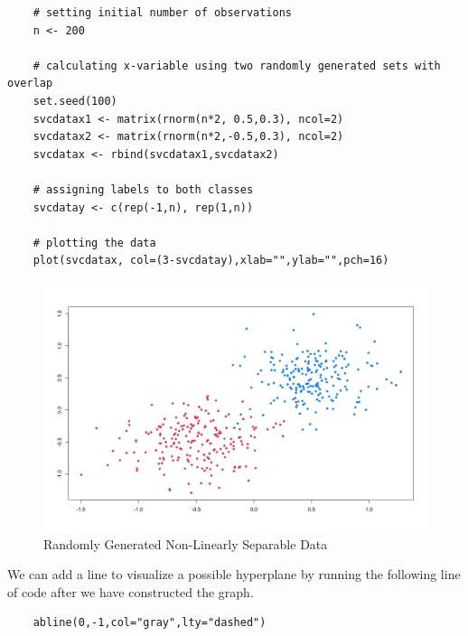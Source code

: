 \documentclass[12pt]{article}
\begin{document}
\begin{verbatim}
    # setting initial number of observations
    n <- 200
    
    # calculating x-variable using two randomly generated sets with overlap
    set.seed(100)
    svcdatax1 <- matrix(rnorm(n*2, 0.5,0.3), ncol=2)
    svcdatax2 <- matrix(rnorm(n*2,-0.5,0.3), ncol=2)
    svcdatax <- rbind(svcdatax1,svcdatax2)
    
    # assigning labels to both classes
    svcdatay <- c(rep(-1,n), rep(1,n))
    
    # plotting the data
    plot(svcdatax, col=(3-svcdatay),xlab="",ylab="",pch=16)
\end{verbatim}

\begin{figure}
    \centering
    \includegraphics[width=5in]{Figures/svc/svc_randomly_generated_points.png}
    \caption{Randomly Generated Non-Linearly Separable Data}
    \label{fig_svc_randomly_generated_points}
\end{figure}

We can add a line to visualize a possible hyperplane by running the following line of code after we have constructed the graph.

\begin{verbatim}
    abline(0,-1,col="gray",lty="dashed")
\end{verbatim}
\end{document}
